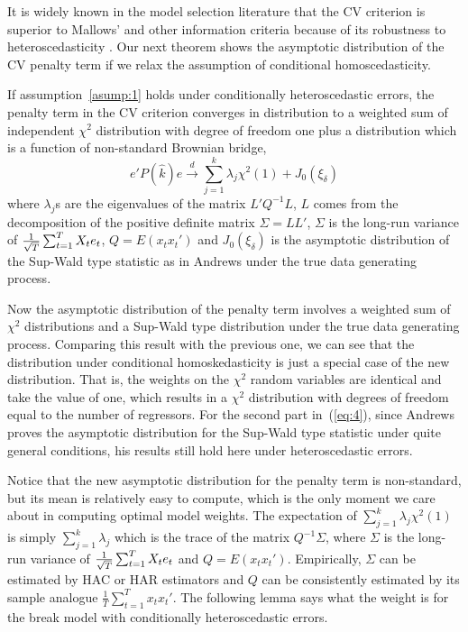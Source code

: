 It is widely known in the model selection literature that the CV criterion is superior to Mallows' and other information criteria because of its robustness to heteroscedasticity \cite{andrews_JE1991}. Our next theorem shows the asymptotic distribution of the CV penalty term if we relax the assumption of conditional homoscedasticity.
\begin{theorem} \label{thm:2}
If assumption~\ref{asump:1} holds under conditionally heteroscedastic errors, the penalty term in the CV criterion converges in distribution to a weighted sum of independent $\chi^2$ distribution with degree of freedom one plus a distribution which is a function of non-standard Brownian bridge,
\begin{equation} \label{eq:4}
	e'P(\hat{k})e \stackrel{d}{\rightarrow} \sum_{j=1}^{k} \lambda_j \chi^2(1) + J_0(\xi_{\delta})
\end{equation}
where $\lambda_j$s are the eigenvalues of the matrix $L'Q^{-1}L$, $L$ comes from the decomposition of the positive definite matrix $\Sigma = LL'$, $\Sigma$ is the long-run variance of $\frac{1}{\sqrt{T}}\sum_{t=1}^{T} X_t e_t$, $Q = E(x_t x_t')$ and $J_0(\xi_{\delta})$ is the asymptotic distribution of the Sup-Wald type statistic as in Andrews \cite{andrews93} under the true data generating process.
\end{theorem}
Now the asymptotic distribution of the penalty term involves a weighted sum of $\chi^2$ distributions and a Sup-Wald type distribution under the true data generating process. Comparing this result with the previous one, we can see that the distribution under conditional homoskedasticity is just a special case of the new distribution. That is, the weights on the $\chi^2$ random variables are identical and take the value of one, which results in a $\chi^2$ distribution with degrees of freedom equal to the number of regressors. For the second part in~(\ref{eq:4}), since Andrews \cite{andrews93} proves the asymptotic distribution for the Sup-Wald type statistic under quite general conditions, his results still hold here under heteroscedastic errors.

Notice that the new asymptotic distribution for the penalty term is non-standard, but its mean is relatively easy to compute, which is the only moment we care about in computing optimal model weights. The expectation of $\sum_{j=1}^{k} \lambda_j \chi^2(1)$ is simply $\sum_{j=1}^{k} \lambda_j$ which is the trace of the matrix $Q^{-1} \Sigma$, where $\Sigma$ is the long-run variance of $\frac{1}{\sqrt{T}}\sum_{t=1}^{T} X_t e_t$ and $Q = E(x_t x_t')$. Empirically, $\Sigma$ can be estimated by HAC or HAR estimators and $Q$ can be consistently estimated by its sample analogue $\frac{1}{T}\sum_{t=1}^{T}x_t x_t'$. The following lemma says what the weight is for the break model with conditionally heteroscedastic errors.

